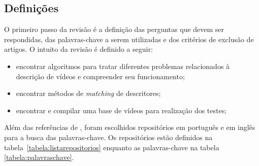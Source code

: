 \subsection{Definições}

O primeiro passo da revisão é a definição das perguntas que devem ser respondidas, das palavras-chave a serem utilizadas e dos critérios de exclusão de artigos. O intuito da revisão é definido a seguir:

\begin{itemize}
\item encontrar algoritmos para tratar diferentes problemas relacionados à descrição de vídeos e compreender seu funcionamento;
\item encontrar métodos de \textit{matching} de descritores;
\item encontrar e compilar uma base de vídeos para realização dos testes;
\end{itemize}

Além das referências de \cite{sylvio2015}, foram escolhidos repositórios em português e em inglês para a busca das palavras-chave. Os repositórios estão definidos na tabela~\ref{tabela:listarepositorios} enquanto as palavras-chave na tabela \ref{tabela:palavraschave}.

\begin{table}[h]
\caption[Lista de repositórios utilizados]{Lista de repositórios utilizados.}
\label{tabela:listarepositorios}
\end{table}

\begin{table}[h]
\caption{Palavras-chave utilizadas na revisão sistemática.}
\label{tabela:palavraschave}
\end{table}


